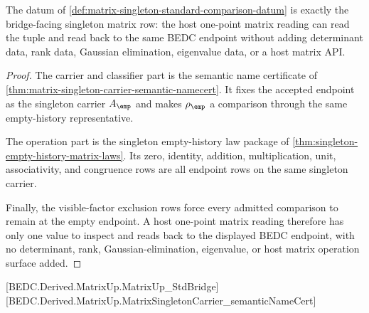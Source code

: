 \begin{theorem}
\label{thm:matrix-singleton-standard-comparison-row}
The datum of \autoref{def:matrix-singleton-standard-comparison-datum} is exactly
the bridge-facing singleton matrix row: the host one-point matrix reading can
read the tuple and read back to the same BEDC endpoint without adding determinant
data, rank data, Gaussian elimination, eigenvalue data, or a host matrix API.
\end{theorem}
\begin{proof}
The carrier and classifier part is the semantic name certificate of
\autoref{thm:matrix-singleton-carrier-semantic-namecert}. It fixes the accepted
endpoint as the singleton carrier $A_{\emp}$ and makes $\rho_{\emp}$ a
comparison through the same empty-history representative.

The operation part is the singleton empty-history law package of
\autoref{thm:singleton-empty-history-matrix-laws}. Its zero, identity, addition,
multiplication, unit, associativity, and congruence rows are all endpoint rows on
the same singleton carrier.

Finally, the visible-factor exclusion rows force every admitted comparison to
remain at the empty endpoint. A host one-point matrix reading therefore has only
one value to inspect and reads back to the displayed BEDC endpoint, with no
determinant, rank, Gaussian-elimination, eigenvalue, or host matrix operation
surface added.
\end{proof}
[BEDC.Derived.MatrixUp.MatrixUp\_StdBridge]
[BEDC.Derived.MatrixUp.MatrixSingletonCarrier\_semanticNameCert]
